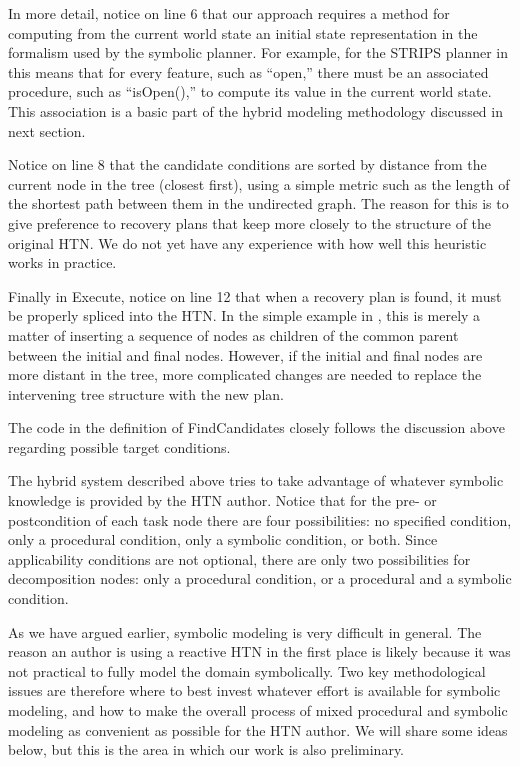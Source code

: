 \documentclass{llncs}
\begin{document}
In more detail, notice on line 6 that our approach requires a method
for computing from the current world state an initial state
representation in the formalism used by the symbolic planner.  For
example, for the STRIPS planner in  this means that
for every feature, such as ``open,'' there must be an associated
procedure, such as ``isOpen(),'' to compute its value in the current
world state. This association is a basic part of the hybrid modeling
methodology discussed in next section.

Notice on line 8 that the candidate conditions are sorted by distance
from the current node in the tree (closest first), using a simple
metric such as the length of the shortest path between them in the
undirected graph.  The reason for this is to give preference to
recovery plans that keep more closely to the structure of the original
HTN.  We do not yet have any experience with how well this heuristic
works in practice.

Finally in {\sc Execute}, notice on line 12 that when a recovery plan
is found, it must be properly spliced into the HTN.  In the simple
example in , this is merely a matter of inserting a
sequence of nodes as children of the common parent between the initial
and final nodes.  However, if the initial and final nodes are more
distant in the tree, more complicated changes are needed to replace
the intervening tree structure with the new plan.

The code in the definition of {\sc FindCandidates} closely follows the 
discussion above regarding possible target conditions. 


\noindent The hybrid system described above tries to take advantage of
whatever symbolic knowledge is provided by the HTN author.  Notice
that for the pre- or postcondition of each task node there are four
possibilities: no specified condition, only a procedural condition,
only a symbolic condition, or both.  Since applicability conditions
are not optional, there are only two possibilities for decomposition
nodes: only a procedural condition, or a procedural and a symbolic
condition.

As we have argued earlier, symbolic modeling is very difficult in
general.  The reason an author is using a reactive HTN in the first
place is likely because it was not practical to fully model the domain
symbolically.  Two key methodological issues are therefore where to
best invest whatever effort is available for symbolic modeling, and
how to make the overall process of mixed procedural and symbolic
modeling as convenient as possible for the HTN author. We will share
some ideas below, but this is the area in which our work is also
preliminary.
\end{document}
